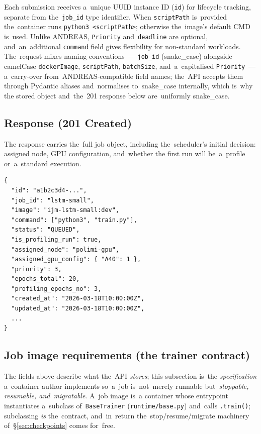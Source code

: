 Each submission receives a~unique UUID instance ID (\texttt{id}) for
lifecycle tracking, separate from the~\texttt{job\_id} type identifier.
When \texttt{scriptPath} is~provided the~container runs
\texttt{python3 <scriptPath>}; otherwise the~image's default CMD is~used.
Unlike ANDREAS, \texttt{Priority} and~\texttt{deadline} are optional,
and~an~additional \texttt{command} field gives flexibility for
non-standard workloads.  The~request mixes naming conventions~---
\texttt{job\_id} (snake\_case) alongside camelCase \texttt{dockerImage},
\texttt{scriptPath}, \texttt{batchSize}, and~a~capitalised \texttt{Priority}~---
a~carry-over from~ANDREAS-compatible field names; the~API accepts them through
Pydantic aliases and~normalises to~snake\_case internally, which is~why the
stored object and~the~201 response below are~uniformly snake\_case.

\subsection{Response (201 Created)}

The response carries the~full job object, including the~scheduler's
initial decision: assigned node, GPU configuration, and~whether the
first run will be~a~profile or~a~standard execution.

\begin{lstlisting}[language={}, numbers=none]
{
  "id": "a1b2c3d4-...",
  "job_id": "lstm-small",
  "image": "ijm-lstm-small:dev",
  "command": ["python3", "train.py"],
  "status": "QUEUED",
  "is_profiling_run": true,
  "assigned_node": "polimi-gpu",
  "assigned_gpu_config": { "A40": 1 },
  "priority": 3,
  "epochs_total": 20,
  "profiling_epochs_no": 3,
  "created_at": "2026-03-18T10:00:00Z",
  "updated_at": "2026-03-18T10:00:00Z",
  ...
}
\end{lstlisting}

\subsection{Job image requirements (the trainer contract)}
\label{sec:job-contract}

The fields above describe what the~API \emph{stores}; this subsection is~the
\emph{specification} a~container author implements so~a~job is~not~merely
runnable but~\emph{stoppable, resumable, and~migratable}.  A~job image is~a
container whose entrypoint instantiates a~subclass of~\texttt{BaseTrainer}
(\texttt{runtime/base.py}) and~calls \texttt{.train()}; subclassing \emph{is}
the~contract, and~in~return the~stop/resume/migrate machinery
of~\S\ref{sec:checkpoints} comes for~free.

